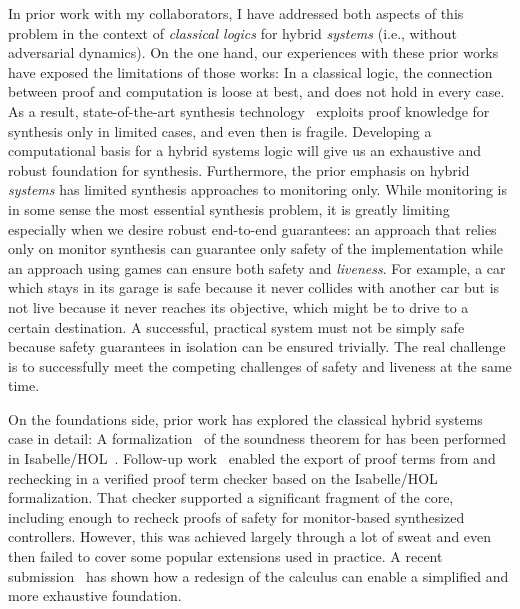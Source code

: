 \documentclass[12pt]{cmuthesis}
\theoremstyle{definition}
\theoremstyle{remark}
\newcommand{\Isabelle}{Isabelle/HOL\xspace}
\begin{document}
In prior work with my collaborators, I have addressed both aspects of this problem in the context of \emph{classical logics} for hybrid \emph{systems} (i.e., without adversarial dynamics).
On the one hand, our experiences with these prior works have exposed the limitations of those works:
In a classical logic, the connection between proof and computation is loose at best, and does not hold in every case.
As a result, state-of-the-art synthesis technology~\cite{DBLP:journals/fmsd/MitschP16} exploits proof knowledge for synthesis only in limited cases, and even then is fragile.
Developing a computational basis for a hybrid systems logic will give us an exhaustive and robust foundation for synthesis.
Furthermore, the prior emphasis on hybrid \emph{systems} has limited synthesis approaches to monitoring only.
While monitoring is in some sense the most essential synthesis problem, it is greatly limiting especially when we desire robust end-to-end guarantees: an approach that relies only on monitor synthesis can guarantee only safety of the implementation while an approach using games can ensure both safety and \emph{liveness}.
For example, a car which stays in its garage is safe because it never collides with another car but is not live because it never reaches its objective, which might be to drive to a certain destination.
A successful, practical system must not be simply safe because safety guarantees in isolation can be ensured trivially.
The real challenge is to successfully meet the competing challenges of safety and liveness at the same time.

On the foundations side, prior work has explored the classical hybrid systems case in detail:
A formalization~\cite{DBLP:conf/cpp/BohrerRVVP17} of the soundness theorem for \dL has been performed in \Isabelle~\cite{DBLP:books/sp/NipkowPW02}.
Follow-up work~\cite{DBLP:conf/pldi/BohrerTMMP18} enabled the export of proof terms from \KeYmaeraX and rechecking in a verified proof term checker based on the \Isabelle formalization.
That checker supported a significant fragment of the \KeYmaeraX core, including enough to recheck proofs of safety for monitor-based synthesized controllers.
However, this was achieved largely through a lot of sweat and even then failed to cover some popular extensions used in practice.
A recent submission~\cite{hilbert-epsilons} has shown how a redesign of the \dL calculus can enable a simplified and more exhaustive foundation.
\end{document}

